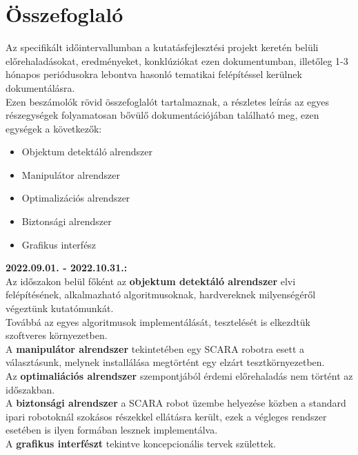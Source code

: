 \documentclass{article}
\begin{document}
\section{Összefoglaló}
Az specifikált időintervallumban a kutatásfejlesztési projekt keretén belüli
előrehaladásokat, eredményeket, konklúziókat ezen dokumentumban, illetőleg
1-3 hónapos periódusokra lebontva hasonló tematikai felépítéssel kerülnek dokumentálásra.\\
Ezen beszámolók rövid összefoglalót tartalmaznak, a részletes leírás az egyes
részegységek folyamatosan bővülő dokumentációjában található meg, ezen egységek
a következők:
\begin{itemize}
    \item Objektum detektáló alrendszer
    \item Manipulátor alrendszer
    \item Optimalizációs alrendszer
    \item Biztonsági alrendszer
    \item Grafikus interfész
\end{itemize}
\textbf{2022.09.01. - 2022.10.31.:}\\
Az időszakon belül főként az \textbf{objektum detektáló alrendszer} elvi felépítésének,
alkalmazható algoritmusoknak, hardvereknek milyenségéről végeztünk kutatómunkát.\\
Továbbá az egyes algoritmusok implementálását, tesztelését is elkezdtük szoftveres
környezetben.\vspace{10pt}\\
A \textbf{manipulátor alrendszer} tekintetében egy SCARA robotra esett a választásunk, melynek
installálása megtörtént egy elzárt tesztkörnyezetben.\vspace{10pt}\\
Az \textbf{optimaliációs alrendszer} szempontjából érdemi előrehaladás nem történt az időszakban.\vspace{10pt}\\
A \textbf{biztonsági alrendszer} a SCARA robot üzembe helyezése közben a standard ipari robotoknál
szokásos részekkel ellátásra került, ezek a végleges rendszer esetében is ilyen formában
lesznek implementálva.\vspace{10pt}\\
A \textbf{grafikus interfészt} tekintve koncepcionális tervek születtek.
\end{document}
